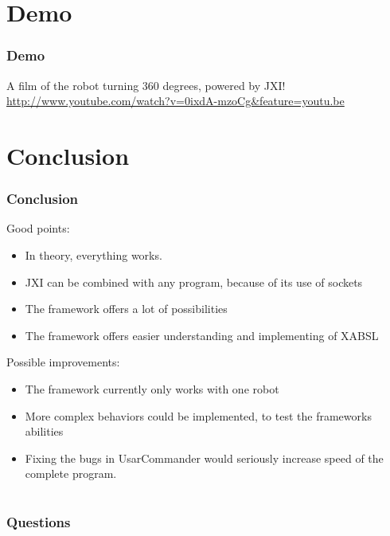 \documentclass{beamer}
\newcommand{\slide}[2]
{
\begin{frame}
\frametitle{#1} 

#2

\end{frame}
}
\begin{document}
\section{Demo}
\slide{Demo}
{
    A film of the robot turning 360 degrees, powered by JXI!
    \url{http://www.youtube.com/watch?v=0ixdA-mzoCg&feature=youtu.be}
}
\section{Conclusion}
\slide{Conclusion}
{
    Good points:
    \begin{itemize}
        \item In theory, everything works.
        \item JXI can be combined with any program, because of its use of
        sockets
        \item The framework offers a lot of possibilities
        \item The framework offers easier understanding and implementing of XABSL
    \end{itemize}
    Possible improvements:
    \begin{itemize}
        \item The framework currently only works with one robot
        \item More complex behaviors could be implemented, to test the
        frameworks abilities
        \item Fixing the bugs in UsarCommander would seriously increase speed of
        the complete program.
    \end{itemize}
}





\section{}
\slide{Questions}
{}
\end{document}

